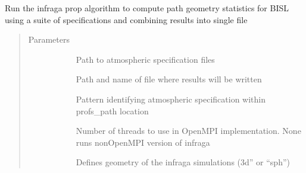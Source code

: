 \documentclass[letterpaper,10pt,english]{sphinxmanual}
\begin{document}
\begin{fulllineitems}
\label{\detokenize{stochprop.propagation:stochprop.propagation.run_infraga}}
Run the infraga \sphinxhyphen{}prop algorithm to compute path geometry
statistics for BISL using a suite of specifications
and combining results into single file
\begin{quote}\begin{description}
\item[{Parameters}] \leavevmode\begin{description}
\item[{}] \leavevmode
Path to atmospheric specification files

\item[{}] \leavevmode
Path and name of file where results will be written

\item[{}] \leavevmode
Pattern identifying atmospheric specification within profs\_path location

\item[{}] \leavevmode
Number of threads to use in OpenMPI implementation.  None runs non\sphinxhyphen{}OpenMPI version of infraga

\item[{}] \leavevmode
Defines geometry of the infraga simulations (3d” or “sph”)


\end{description}
\end{description}
\end{quote}
\end{fulllineitems}
\end{document}
